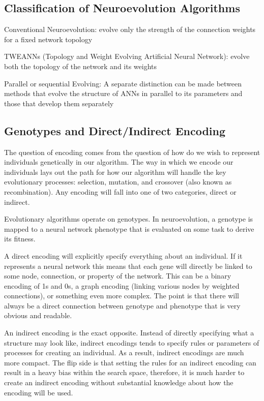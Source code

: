 \documentclass[journal, a4paper]{IEEEtran}
\begin{document}
\subsection{Classification of Neuroevolution Algorithms}
Conventional Neuroevolution:
evolve only the strength of the connection weights for a fixed network topology

TWEANNs (Topology and Weight Evolving Artificial Neural Network):
evolve both the topology of the network and its weights

Parallel or sequential Evolving:
A separate distinction can be made between methods that evolve the structure of ANNs in parallel to its parameters and those that develop them separately


\subsection{Genotypes and Direct/Indirect Encoding}
The question of encoding comes from the question of how do we wish to represent individuals genetically in our algorithm. The way in which we encode our individuals lays out the path for how our algorithm will handle the key evolutionary processes: selection, mutation, and crossover (also known as recombination). Any encoding will fall into one of two categories, direct or indirect.

Evolutionary algorithms operate on genotypes. In neuroevolution, a genotype is mapped to a neural network phenotype that is evaluated on some task to derive its fitness.

A direct encoding will explicitly specify everything about an individual. If it represents a neural network this means that each gene will directly be linked to some node, connection, or property of the network. This can be a binary encoding of 1s and 0s, a graph encoding (linking various nodes by weighted connections), or something even more complex. The point is that there will always be a direct connection between genotype and phenotype that is very obvious and readable. \cite{cite02}

An indirect encoding is the exact opposite. Instead of directly specifying what a structure may look like, indirect encodings tends to specify rules or parameters of processes for creating an individual. As a result, indirect encodings are much more compact. The flip side is that setting the rules for an indirect encoding can result in a heavy bias within the search space, therefore, it is much harder to create an indirect encoding without substantial knowledge about how the encoding will be used. \cite{cite02}
\end{document}
